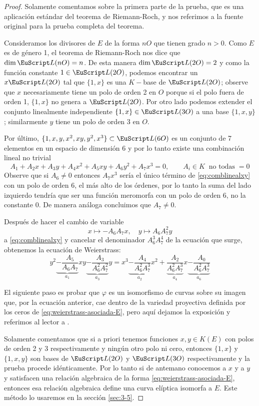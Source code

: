 \documentclass[../../tesis_maestria]{subfiles}
\begin{document}
\begin{proof}
	Solamente comentamos sobre la primera parte de la prueba, que es una aplicación estándar del teorema de Riemann-Roch, y nos referimos a la fuente original \cite[III.3.1]{SilvermanTAOEC} para la prueba completa del teorema.
	
	Consideramos los divisores de $E$ de la forma $nO$ que tienen grado $n>0$. Como $E$ es de género 1, el teorema de Riemann-Roch nos dice que $\dim\Ll(nO)=n$. De esta manera $\dim\Ll(2O)=2$ y como la función constante $1\in\Ll(2O)$, podemos encontrar un $x\Ll(2O)$ tal que $\{1,x\}$ es una $K-$base de $\Ll(2O)$; observe que $x$ necesariamente tiene un polo de orden 2 en $O$ porque si el polo fuera de orden 1, $\{1,x\}$ no genera a $\Ll(2O)$. Por otro lado podemos extender el conjunto linealmente independiente $\{1,x\}\in\Ll(3O)$ a una base $\{1,x,y\}$; similarmente $y$ tiene un polo de orden 3 en $O$.
	
	Por último, $\{1,x,y,x^2,xy,y^2,x^3\}\subset\Ll(6O)$ es un conjunto de 7 elementos en un espacio de dimensión 6 y por lo tanto existe una combinación lineal no trivial
\begin{equation}\label{eq:comblinealxy}
	A_1+A_2x+A_3y+A_4x^2+A_5xy+A_6y^2+A_7x^3=0,\qquad A_i\in K\;\;\text{no todas}\;=0
\end{equation}
Observe que si $A_6\neq0$ entonces $A_7 x^3$ sería el único término de \eqref{eq:comblinealxy} con un polo de orden 6, el más alto de los órdenes, por lo tanto la suma del lado izquierdo tendría que ser una función meromorfa con un polo de orden 6, no la constante 0. De manera análoga concluimos que $A_7\neq0$.

Después de hacer el cambio de variable
\begin{equation}\label{eq:cambio-variable-weierstrass-general}
	x\mapsto -A_6A_7x,\quad y\mapsto A_6A_7^2y
\end{equation}
a \eqref{eq:comblinealxy} y cancelar el denominador $A_6^3A_7^4$ de la ecuación que surge, obtenemos la ecuación de Weierstrass:
\[
	y^2\underset{a_1}{\underbrace{-\frac{A_5}{A_6A_7}}}xy
	\underset{a_3}{\underbrace{-\frac{A_3}{A_6^2A_7^2}}}y
	=x^3
	\underset{a_2}{\underbrace{-\frac{A_4}{A_6^2A_7^3}}}x^2
	+\underset{a_4}{\underbrace{\frac{A_2}{A_6^2A_7^3}}}x
	\underset{a_6}{\underbrace{-\frac{A_0}{A_6^2A_7^3}}}
\]

El siguiente paso es probar que $\varphi$ es un isomorfismo de curvas sobre su imagen que, por la ecuación anterior, cae dentro de la variedad proyectiva definida por los ceros de \eqref{eq:weierstrass-asociada-E}, pero aquí dejamos la exposición y referimos al lector a \cite{SilvermanTAOEC}.

Solamente comentamos que si a priori tenemos funciones $x,y\in K(E)$ con polos de orden 2 y 3 respectivamente y ningún otro polo ni cero, entonces $\{1,x\}$ y $\{1,x,y\}$ son bases de $\Ll(2O)$ y $\Ll(3O)$ respectivamente y la prueba procede idénticamente. Por lo tanto si de antemano conocemos a $x$ y a $y$ y satisfacen una relación algebraica de la forma \eqref{eq:weierstrass-asociada-E}, entonces esa relación algebraica define una curva elíptica isomorfa a $E$. Este método lo usaremos en la sección \ref{sec:3-5}.
\end{proof}
\end{document}
